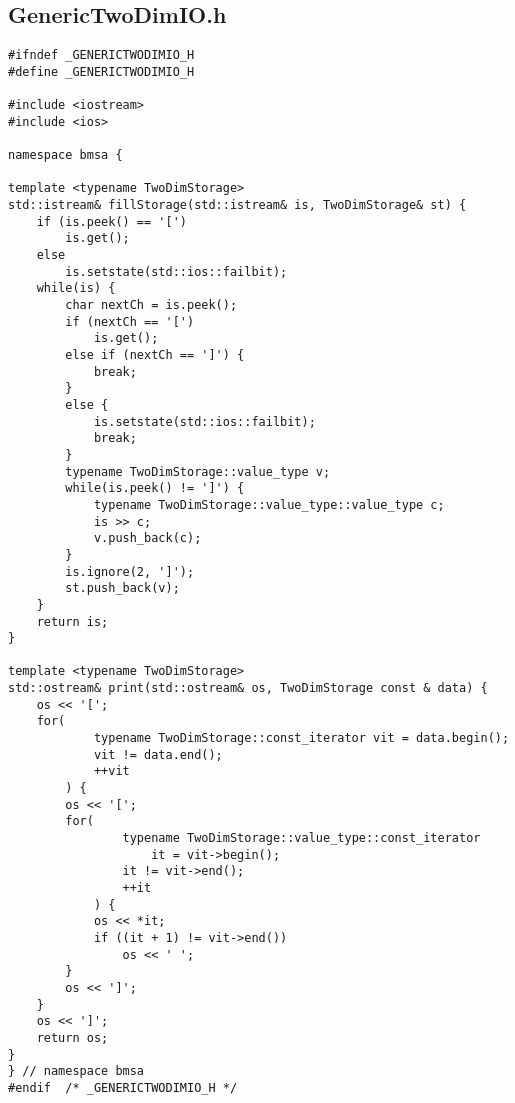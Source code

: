 \subsection*{GenericTwoDimIO.h}
\begin{lstlisting}
#ifndef _GENERICTWODIMIO_H
#define	_GENERICTWODIMIO_H

#include <iostream>
#include <ios>

namespace bmsa {

template <typename TwoDimStorage>
std::istream& fillStorage(std::istream& is, TwoDimStorage& st) {
    if (is.peek() == '[')
        is.get();
    else
        is.setstate(std::ios::failbit);
    while(is) {
        char nextCh = is.peek();
        if (nextCh == '[')
            is.get();
        else if (nextCh == ']') {
            break;
        }
        else {
            is.setstate(std::ios::failbit);
            break;
        }
        typename TwoDimStorage::value_type v;
        while(is.peek() != ']') {
            typename TwoDimStorage::value_type::value_type c;
            is >> c;
            v.push_back(c);
        }
        is.ignore(2, ']');
        st.push_back(v);
    }
    return is;
}

template <typename TwoDimStorage>
std::ostream& print(std::ostream& os, TwoDimStorage const & data) {
    os << '[';
    for(
            typename TwoDimStorage::const_iterator vit = data.begin();
            vit != data.end();
            ++vit
        ) {
        os << '[';
        for(
                typename TwoDimStorage::value_type::const_iterator
                    it = vit->begin();
                it != vit->end();
                ++it
            ) {
            os << *it;
            if ((it + 1) != vit->end())
                os << ' ';
        }
        os << ']';
    }
    os << ']';
    return os;
}
} // namespace bmsa
#endif	/* _GENERICTWODIMIO_H */
\end{lstlisting}


